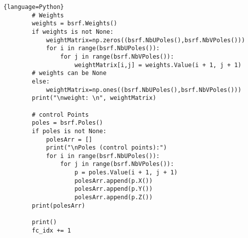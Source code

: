 \begin{adjustwidth}{-0.5cm}{-0.5cm}
\begin{lstlisting}{language=Python}
        # Weights 
        weights = bsrf.Weights()
        if weights is not None:
            weightMatrix=np.zeros((bsrf.NbUPoles(),bsrf.NbVPoles()))
            for i in range(bsrf.NbUPoles()):
                for j in range(bsrf.NbVPoles()):
                    weightMatrix[i,j] = weights.Value(i + 1, j + 1)       
        # weights can be None
        else:
            weightMatrix=np.ones((bsrf.NbUPoles(),bsrf.NbVPoles()))    
        print("\nweight: \n", weightMatrix)

        # control Points
        poles = bsrf.Poles()
        if poles is not None:
            polesArr = []
            print("\nPoles (control points):")
            for i in range(bsrf.NbUPoles()):
                for j in range(bsrf.NbVPoles()):
                    p = poles.Value(i + 1, j + 1)
                    polesArr.append(p.X())
                    polesArr.append(p.Y())
                    polesArr.append(p.Z())
        print(polesArr)

        print()
        fc_idx += 1
\end{lstlisting}
\end{adjustwidth}
